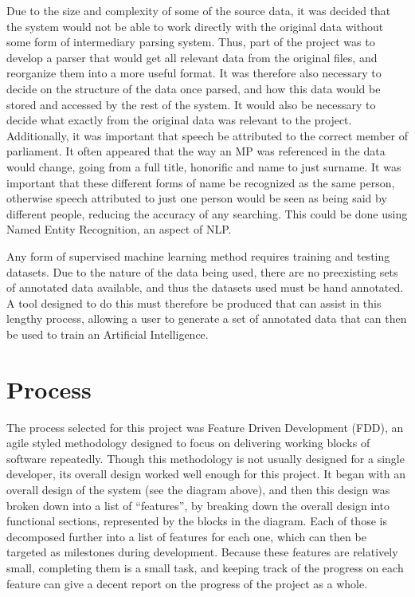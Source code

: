 Due to the size and complexity of some of the source data, it was decided that the system would not be able to work directly with the original data without some form of intermediary parsing system. Thus, part of the project was to develop a parser that would get all relevant data from the original files, and reorganize them into a more useful format. It was therefore also necessary to decide on the structure of the data once parsed, and how this data would be stored and accessed by the rest of the system. It would also be necessary to decide what exactly from the original data was relevant to the project.
Additionally, it was important that speech be attributed to the correct member of parliament. It often appeared that the way an MP was referenced in the data would change, going from a full title, honorific and name to just surname. It was important that these different forms of name be recognized as the same person, otherwise speech attributed to just one person would be seen as being said by different people, reducing the accuracy of any searching. This could be done using Named Entity Recognition, an aspect of NLP.

Any form of supervised machine learning method requires training and testing datasets. Due to the nature of the data being used, there are no preexisting sets of annotated data available, and thus the datasets used must be hand annotated. A tool designed to do this must therefore be produced that can assist in this lengthy process, allowing a user to generate a set of annotated data that can then be used to train an Artificial Intelligence.

\section{Process}
The process selected for this project was Feature Driven Development (FDD), an agile styled methodology designed to focus on delivering working blocks of software repeatedly. Though this methodology is not usually designed for a single developer, its overall design worked well enough for this project. It began with an overall design of the system (see the diagram above), and then this design was broken down into a list of “features”, by breaking down the overall design into functional sections, represented by the blocks in the diagram. Each of those is decomposed further into a list of features for each one, which can then be targeted as milestones during development. Because these features are relatively  small, completing them is a small task, and keeping track of the progress on each feature can give a decent report on the progress of the project as a whole.

